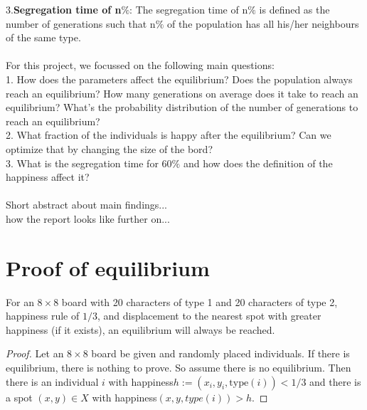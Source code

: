 \documentclass{article}
\begin{document}
3.\textbf{Segregation time of n$\%$}: The segregation time of n$\%$ is defined as the number of generations such that n$\%$ of the population has all his/her neighbours of the same type.
\\
\\
For this project, we focussed on the following main questions:\\
1. How does the parameters affect the equilibrium? Does the population always reach an equilibrium? How many generations on average does it take to reach an equilibrium? What's the probability distribution of the number of generations to reach an equilibrium?\\
2. What fraction of the individuals is happy after the equilibrium? Can we optimize that by changing the size of the bord?\\
3. What is the segregation time for 60$\%$ and how does the definition of the happiness affect it?\\
\\
Short abstract about main findings...\\
how the report looks like further on...
\section{Proof of equilibrium}

For an $8\times 8$ board with 20 characters of type 1 and 20 characters of type 2, happiness rule of $1/3$, and displacement to the nearest spot with greater happiness (if it exists), an equilibrium will always be reached.
\begin{proof}
Let an $8\times 8$ board be given and randomly placed individuals. If there is equilibrium, there is nothing to prove. So assume there is no equilibrium. Then there is an individual $i$ with happiness$h := (x_i,y_i,\text{type}(i)) < 1/3$ and there is a spot $(x,y)\in X$ with happiness$(x,y,type(i)) > h$.
\end{proof} 
\end{document}
